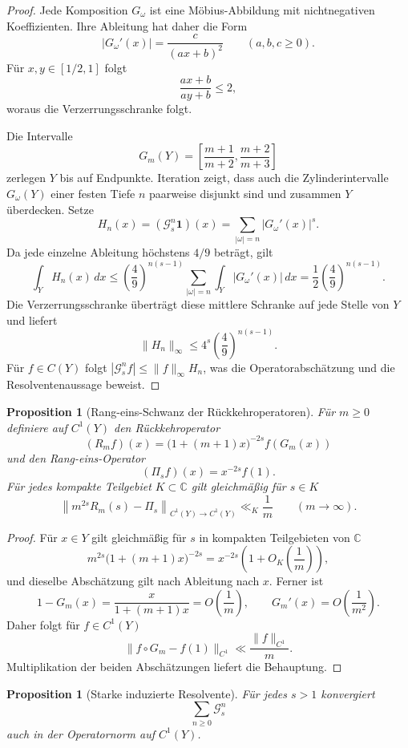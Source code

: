\documentclass[11pt,a4paper]{article}
\newtheorem{proposition}[remark]{Proposition}
\begin{document}
\begin{proof}
Jede Komposition $G_\omega$ ist eine Möbius-Abbildung mit nichtnegativen
Koeffizienten. Ihre Ableitung hat daher die Form
\[
 |G_\omega'(x)|=\frac{c}{(ax+b)^2}
 \qquad(a,b,c\ge0).
\]
Für $x,y\in[1/2,1]$ folgt
\[
 \frac{ax+b}{ay+b}\le2,
\]
woraus die Verzerrungsschranke folgt.

Die Intervalle
\[
 G_m(Y)=
 \left[
 \frac{m+1}{m+2},
 \frac{m+2}{m+3}
 \right]
\]
zerlegen $Y$ bis auf Endpunkte. Iteration zeigt, dass auch die
Zylinderintervalle $G_\omega(Y)$ einer festen Tiefe $n$ paarweise
disjunkt sind und zusammen $Y$ überdecken. Setze
\[
 H_n(x)=(\mathcal G_s^n\mathbf 1)(x)
 =\sum_{|\omega|=n}|G_\omega'(x)|^s.
\]
Da jede einzelne Ableitung höchstens $4/9$ beträgt, gilt
\[
 \int_YH_n(x)\,dx
 \le
 \left(\frac49\right)^{n(s-1)}
 \sum_{|\omega|=n}\int_Y|G_\omega'(x)|\,dx
 =
 \frac12\left(\frac49\right)^{n(s-1)}.
\]
Die Verzerrungsschranke überträgt diese mittlere Schranke auf jede Stelle
von $Y$ und liefert
\[
 \|H_n\|_\infty
 \le4^s\left(\frac49\right)^{n(s-1)}.
\]
Für $f\in C(Y)$ folgt
$|\mathcal G_s^nf|\le\|f\|_\infty H_n$, was die
Operatorabschätzung und die Resolventenaussage beweist.
\end{proof}

\begin{proposition}[Rang-eins-Schwanz der Rückkehroperatoren]
Für $m\ge0$ definiere auf $C^1(Y)$ den Rückkehroperator
\[
 (R_mf)(x)
 =
 \bigl(1+(m+1)x\bigr)^{-2s}f(G_m(x))
\]
und den Rang-eins-Operator
\[
 (\Pi_sf)(x)=x^{-2s}f(1).
\]
Für jedes kompakte Teilgebiet $K\subset\mathbb C$ gilt
gleichmäßig für $s\in K$
\[
 \left\|m^{2s}R_m(s)-\Pi_s\right\|_{C^1(Y)\to C^1(Y)}
 \ll_K\frac1m
 \qquad(m\to\infty).
\]
\end{proposition}

\begin{proof}
Für $x\in Y$ gilt gleichmäßig für $s$ in kompakten Teilgebieten von
$\mathbb C$
\[
 m^{2s}\bigl(1+(m+1)x\bigr)^{-2s}
 =
 x^{-2s}\left(1+O_K\!\left(\frac1m\right)\right),
\]
und dieselbe Abschätzung gilt nach Ableitung nach $x$. Ferner ist
\[
 1-G_m(x)
 =
 \frac{x}{1+(m+1)x}
 =O\!\left(\frac1m\right),
 \qquad
 G_m'(x)=O\!\left(\frac1{m^2}\right).
\]
Daher folgt für $f\in C^1(Y)$
\[
 \|f\circ G_m-f(1)\|_{C^1}
 \ll\frac{\|f\|_{C^1}}m.
\]
Multiplikation der beiden Abschätzungen liefert die Behauptung.
\end{proof}

\begin{proposition}[Starke induzierte Resolvente]
Für jedes $s>1$ konvergiert
\[
 \sum_{n\ge0}\mathcal G_s^n
\]
auch in der Operatornorm auf $C^1(Y)$.
\end{proposition}
\end{document}
